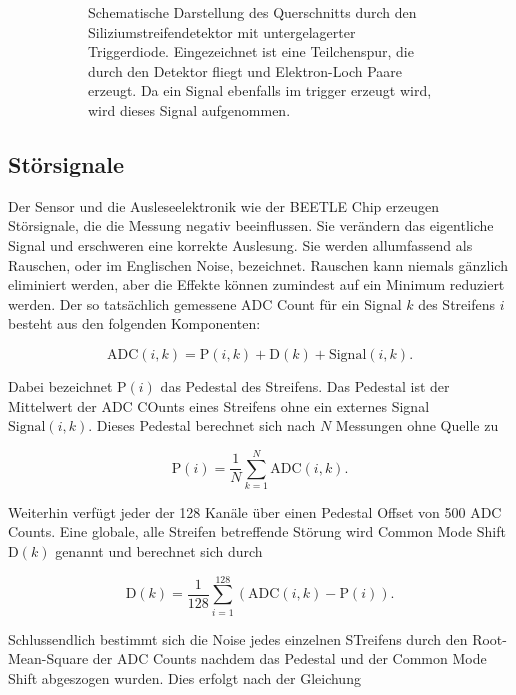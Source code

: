 \begin{figure}
\begin{subfigure}{0.45\textwidth}
    \caption{Schematische Darstellung des Querschnitts durch den Siliziumstreifendetektor mit untergelagerter Triggerdiode. Eingezeichnet ist eine Teilchenspur, die durch den Detektor fliegt und Elektron-Loch Paare erzeugt. Da ein Signal ebenfalls im trigger erzeugt wird, wird dieses Signal aufgenommen.}
    \label{fig:trigger}
  \end{subfigure}%
  \caption{}
\end{figure}

\subsection{Störsignale}

Der Sensor und die Ausleseelektronik wie der BEETLE Chip erzeugen Störsignale, die die Messung negativ beeinflussen.
Sie verändern das eigentliche Signal und erschweren eine korrekte Auslesung.
Sie werden allumfassend als Rauschen, oder im Englischen Noise, bezeichnet.
Rauschen kann niemals gänzlich eliminiert werden, aber die Effekte können zumindest auf ein Minimum reduziert werden.
Der so tatsächlich gemessene ADC Count für ein Signal $k$ des Streifens $i$ besteht aus den folgenden Komponenten:

\begin{equation}
  \mathup{ADC}(i,k) = \mathup{P}(i,k) + \mathup{D}(k) + \mathup{Signal}(i,k).
\end{equation}

Dabei bezeichnet $\mathup{P}(i)$ das Pedestal des Streifens.
Das Pedestal ist der Mittelwert der ADC COunts eines Streifens ohne ein externes Signal $\mathup{Signal}(i,k)$.
Dieses Pedestal berechnet sich nach $N$ Messungen ohne Quelle zu

\begin{equation}
  \mathup{P}(i) = \frac{1}{N} \sum^N_{k=1} \mathup{ADC}(i,k).
\end{equation}

Weiterhin verfügt jeder der 128 Kanäle über einen Pedestal Offset von 500 ADC Counts.
Eine globale, alle Streifen betreffende Störung wird Common Mode Shift $\mathup{D}(k)$ genannt und berechnet sich durch

\begin{equation}
  \mathup{D}(k) = \frac{1}{128} \sum^{128}_{i=1} (\mathup{ADC}(i,k) - \mathup{P}(i)).
\end{equation}

Schlussendlich bestimmt sich die Noise jedes einzelnen STreifens durch den Root-Mean-Square der ADC Counts nachdem das Pedestal und der Common Mode Shift abgeszogen wurden.
Dies erfolgt nach der Gleichung


